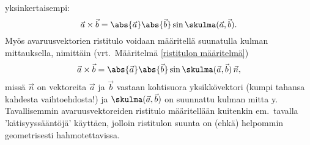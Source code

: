 yksinkertaisempi:
\[
\vec a \times \vec b =\abs{\vec a}\abs{\vec b}\sin{\skulma(\vec a, \vec b)}. 
\]
Myös avaruusvektorien ristitulo voidaan määritellä suunatulla kulman mittauksella, nimittäin
(vrt.\ Määritelmä \ref{ristitulon määritelmä})
\[
\vec a \times \vec b = \abs{\vec a}\abs{\vec b}\sin\skulma(\vec a,\vec b)\,\vec n,
\]
missä $\vec n$ on vektoreita $\vec a$ ja $\vec b$ vastaan kohtisuora yksikkövektori (kumpi
tahansa kahdesta vaihtoehdosta!) ja $\displaystyle{\skulma(\vec a,\vec b)}$ on suunnattu 
kulman mitta    y. 
Tavallisemmin avaruusvektoreiden ristitulo määritellään kuitenkin em.\ tavalla 
'kätisyyssääntöjä' käyttäen, jolloin ristitulon suunta on (ehkä) helpommin geometrisesti 
hahmotettavissa.
